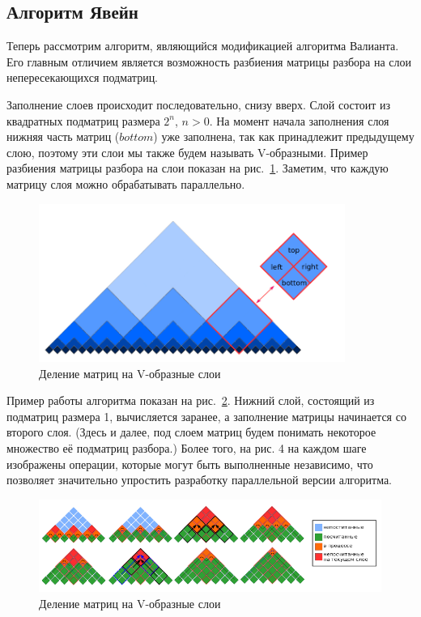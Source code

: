 \documentclass[14pt]{matmex-diploma-custom}
\begin{document}
\subsection{Алгоритм Явейн}

Теперь рассмотрим алгоритм, являющийся модификацией алгоритма Валианта. Его главным отличием является возможность разбиения матрицы разбора на слои непересекающихся подматриц.

Заполнение слоев происходит последовательно, снизу вверх. Слой состоит из квадратных подматриц размера $2^n$, $n > 0$. На момент начала заполнения слоя нижняя часть матриц ($bottom$) уже заполнена, так как принадлежит предыдущему слою, поэтому эти слои мы также будем называть V-образными. Пример разбиения матрицы разбора на слои показан на рис.~\ref{fig2}. Заметим, что каждую матрицу слоя можно обрабатывать параллельно. 


\begin{figure}
\vspace{3mm}
 \begin{center}
    \centering
    \includegraphics[width=10cm]{layers.png}
    \caption{Деление матриц на V-образные слои}
    \label{fig2}
 \end{center}
\vspace{-8mm}
\end{figure}

Пример работы алгоритма показан на рис.~\ref{modvis}. Нижний слой, состоящий из подматриц размера 1, вычисляется заранее, а заполнение матрицы начинается со второго слоя. (Здесь и далее, под слоем матриц будем понимать некоторое множество её подматриц разбора.) Более того, на рис. 4 на каждом шаге изображены операции, которые могут быть выполненные независимо, что позволяет значительно упростить разработку параллельной версии алгоритма.

\begin{figure}[h]
\vspace{3mm}
 \begin{center}
    \centering
    \includegraphics[width=16cm]{modivis2.png}
    \caption{Деление матриц на V-образные слои}
    \label{modvis}
 \end{center}
\vspace{-8mm}
\end{figure}
\end{document}
